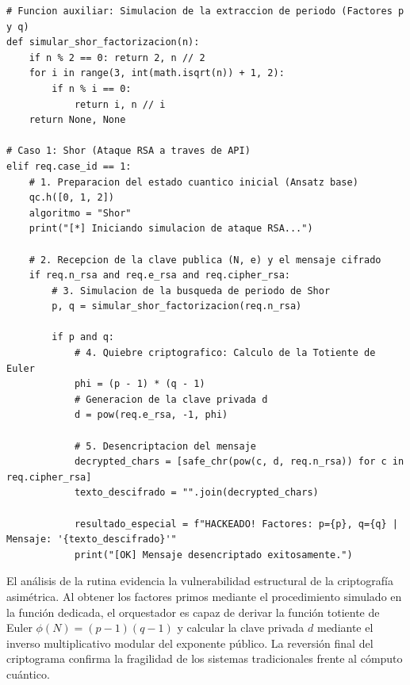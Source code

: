 \documentclass[12pt,a4paper]{article}
\begin{document}
\begin{lstlisting}[caption={Orquestación del Algoritmo de Shor y Ataque RSA}]
# Funcion auxiliar: Simulacion de la extraccion de periodo (Factores p y q)
def simular_shor_factorizacion(n):
    if n % 2 == 0: return 2, n // 2
    for i in range(3, int(math.isqrt(n)) + 1, 2):
        if n % i == 0:
            return i, n // i
    return None, None

# Caso 1: Shor (Ataque RSA a traves de API)
elif req.case_id == 1:
    # 1. Preparacion del estado cuantico inicial (Ansatz base)
    qc.h([0, 1, 2]) 
    algoritmo = "Shor"
    print("[*] Iniciando simulacion de ataque RSA...")
    
    # 2. Recepcion de la clave publica (N, e) y el mensaje cifrado
    if req.n_rsa and req.e_rsa and req.cipher_rsa:
        # 3. Simulacion de la busqueda de periodo de Shor
        p, q = simular_shor_factorizacion(req.n_rsa)
        
        if p and q:
            # 4. Quiebre criptografico: Calculo de la Totiente de Euler
            phi = (p - 1) * (q - 1)
            # Generacion de la clave privada d
            d = pow(req.e_rsa, -1, phi) 
            
            # 5. Desencriptacion del mensaje
            decrypted_chars = [safe_chr(pow(c, d, req.n_rsa)) for c in req.cipher_rsa]
            texto_descifrado = "".join(decrypted_chars)
            
            resultado_especial = f"HACKEADO! Factores: p={p}, q={q} | Mensaje: '{texto_descifrado}'"
            print("[OK] Mensaje desencriptado exitosamente.")
\end{lstlisting}

El análisis de la rutina evidencia la vulnerabilidad estructural de la criptografía asimétrica. Al obtener los factores primos mediante el procedimiento simulado en la función dedicada, el orquestador es capaz de derivar la función totiente de Euler $\phi(N) = (p-1)(q-1)$ y calcular la clave privada $d$ mediante el inverso multiplicativo modular del exponente público. La reversión final del criptograma confirma la fragilidad de los sistemas tradicionales frente al cómputo cuántico.\\
\end{document}
